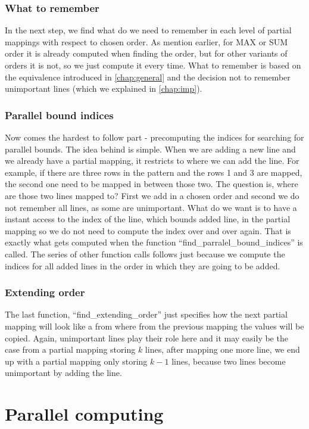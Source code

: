 \subsubsection{What to remember}
In the next step, we find what do we need to remember in each level of partial mappings with respect to chosen order. As mention earlier, for MAX or SUM order it is already computed when finding the order, but for other variants of orders it is not, so we just compute it every time. What to remember is based on the equivalence introduced in \autoref{chap:general} and the decision not to remember unimportant lines (which we explained in \autoref{chap:imp}).

\subsubsection{Parallel bound indices}
Now comes the hardest to follow part - precomputing the indices for searching for parallel bounds. The idea behind is simple. When we are adding a new line and we already have a partial mapping, it restricts to where we can add the line. For example, if there are three rows in the pattern and the rows 1 and 3 are mapped, the second one need to be mapped in between those two. The question is, where are those two lines mapped to? First we add in a chosen order and second we do not remember all lines, as some are unimportant. What do we want is to have a instant access to the index of the line, which bounds added line, in the partial mapping so we do not need to compute the index over and over again. That is exactly what gets computed when the function ``find\_parralel\_bound\_indices'' is called. The series of other function calls follows just because we compute the indices for all added lines in the order in which they are going to be added.

\subsubsection{Extending order}
The last function, ``find\_extending\_order'' just specifies how the next partial mapping will look like a from where from the previous mapping the values will be copied. Again, unimportant lines play their role here and it may easily be the case from a partial mapping storing $k$ lines, after mapping one more line, we end up with a partial mapping only storing $k-1$ lines, because two lines become unimportant by adding the line.

\section{Parallel computing}

